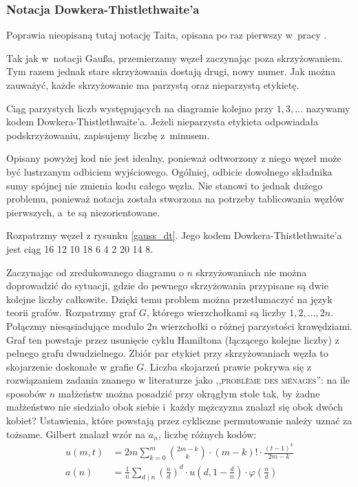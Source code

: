 %

\subsubsection{Notacja Dowkera-Thistlethwaite'a}
Poprawia nieopisaną tutaj notację Taita, opisana po raz pierwszy w~pracy \cite{dowker1983}.
%
%

Tak jak w~notacji Gaußa, przemierzamy węzeł zaczynając poza skrzyżowaniem.
Tym razem jednak stare skrzyżowania dostają drugi, nowy numer.
Jak można zauważyć, każde skrzyżowanie ma parzystą oraz nieparzystą etykietę.

\begin{definition}
    Ciąg parzystych liczb występujących na diagramie kolejno przy $1, 3, \ldots$ nazywamy kodem Dowkera-Thistlethwaite'a.
    Jeżeli nieparzysta etykieta odpowiadała podskrzyżowaniu, zapisujemy liczbę z~minusem.
\end{definition}

Opisany powyżej kod nie jest idealny, ponieważ odtworzony z niego węzeł może być lustrzanym odbiciem wyjściowego.
Ogólniej, odbicie dowolnego składnika sumy spójnej nie zmienia kodu całego węzła.
Nie stanowi to jednak dużego problemu, ponieważ notacja została stworzona na potrzeby tablicowania węzłów pierwszych, a~te są niezorientowane.

\begin{example}
    Rozpatrzmy węzeł z rysunku \ref{gauss_dt}.
    Jego kodem Dowkera-Thistlethwaite'a jest ciąg {16 12 10 18 6 4 2 20 14 8}.
\end{example}

Zaczynając od zredukowanego diagramu o $n$ skrzyżowaniach nie można doprowadzić do sytuacji, gdzie do pewnego skrzyżowania przypisane są dwie kolejne liczby całkowite.
Dzięki temu problem można przetłumaczyć na język teorii grafów.
Rozpatrzmy graf $G$, którego wierzchołkami są liczby $1, 2, \ldots, 2n$.
Połączmy niesąsiadujące modulo $2n$ wierzchołki o różnej parzystości krawędziami.
Graf ten powstaje przez usunięcie cyklu Hamiltona (łączącego kolejne liczby) z pełnego grafu dwudzielnego.
Zbiór par etykiet przy skrzyżowaniach węzła to skojarzenie doskonałe w grafie $G$.
Liczba skojarzeń prawie pokrywa się z rozwiązaniem zadania znanego w literaturze jako ,,\textsc{problème des ménages}'': na ile sposobów $n$ małżeństw można posadzić przy okrągłym stole tak, by żadne małżeństwo nie siedziało obok siebie i~każdy mężczyzna znalazł się obok dwóch kobiet?
%
Ustawienia, które powstają przez cykliczne permutowanie należy uznać za tożsame.
Gilbert \cite{gilbert1956} znalazł wzór na $a_n$, liczbę różnych kodów:
%
\begin{align}
u(m, t) & = 2m \sum_{k=0}^m {2m-k \choose k} \cdot (m-k)! \cdot \frac{(t-1)^k}{2m - k}  \\
a(n) & = \frac{1}{n} \sum_{d\mid n} \left(\frac{n}{d}\right)^d \cdot u \left(d, 1 - \frac{d}{n}\right) \cdot \varphi \left(\frac{n}{d}\right)
\end{align}

